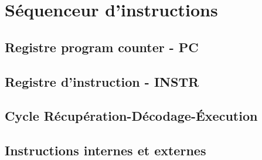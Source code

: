 \chapter{Séquenceur d'instructions}

\section{Registre program counter - PC}

\section{Registre d'instruction - INSTR}

\section{Cycle Récupération-Décodage-Éxecution}

\section{Instructions internes et externes}

